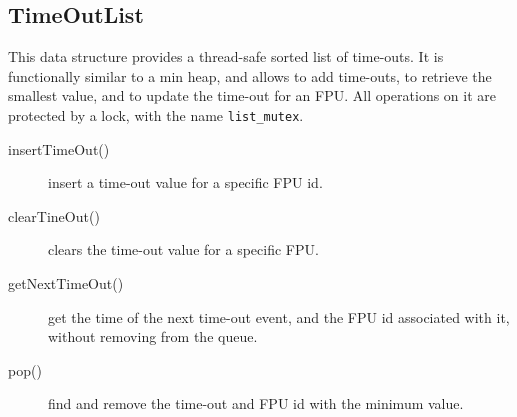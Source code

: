 \documentclass[fontsize=12,a4paper]{scrartcl}
\begin{document}
\subsection{TimeOutList}

This data structure provides a thread-safe sorted list of
time-outs. It is functionally similar to a min heap, and allows to add
time-outs, to retrieve the smallest value, and to update the time-out
for an FPU. All operations on it are protected by a lock, with the
name \texttt{list\_mutex}.

\begin{description}
  \item[insertTimeOut()] insert a time-out value for a specific FPU id.
  \item[clearTineOut()] clears the time-out value for a specific FPU.
  \item[getNextTimeOut()] get the time of the next time-out event,
    and the FPU id associated with it, without removing from the queue.
  \item[pop()] find and remove the time-out and FPU id with the
    minimum value.
\end{description}

\newpage

\end{document}
